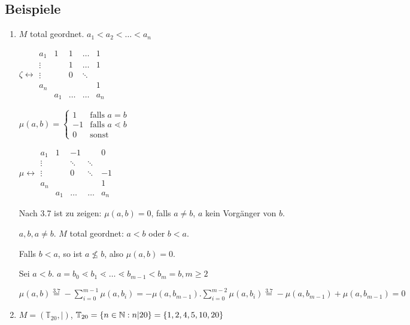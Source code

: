 \subsection{Beispiele} %

\begin{enumerate}
	\item 
	$M$ total geordnet. $a_1 < a_2 < \dots < a_n$
	
	$\zeta \leftrightarrow
	\begin{array}{c|cccc|}
	a_1 	& 1 & 1 & \dots & 1 \\
	\vdots  &	& 1 & \dots & 1 \\
	\vdots  & 	& 0 & \ddots & \\
	a_n		&   &	&		& 1 \\ %
			& a_1 & \dots &\dots & a_n
	\end{array}$
	
	$\mu(a, b) = \begin{cases}
	1 & \text{falls } a = b  \\
	-1 & \text{falls } a \lessdot b \\
	0 & \text{sonst}
	\end{cases}$
	
	$\mu \leftrightarrow
	\begin{array}{c|cccc|}
		a_1 	& 1 & -1 &  & 0 \\
		\vdots  &	& \ddots & \ddots &  \\
		\vdots  & 	& 0 & \ddots & -1\\
		a_n		&   &	&		& 1 \\ %
				& a_1 & \dots &\dots & a_n
		\end{array}$
		
	Nach 3.7 %
	ist zu zeigen: $\mu(a, b) = 0$, falls $a \neq b$, $a$ kein Vorgänger von $b$.
	
	$a, b, a \neq b$. $M$ total geordnet: $a < b$ oder $b < a$.
	
	Falls $b < a$, so ist $ a \nleq b$, also $\mu(a, b) = 0$.
	
	Sei $a < b$. $a = b_0 \lessdot b_1 \lessdot \dots \lessdot b_{m-1} < b_m = b, m \geq 2$
	
	$\mu(a, b) \stackrel{3.7}{=} %
	- \sum_{i=0}^{m-1}\mu(a, b_i) 
	= - \mu(a, b_{m-1}) . \sum_{i=0}^{m-2}\mu(a, b_i)
	\stackrel{3.7}{=} %
	- \mu(a, b_{m-1}) + \mu(a, b_{m-1})	= 0$
	
	
	\item
	
	$M = (\mathbb{T}_{20}, |)$,
	$\mathbb{T}_{20} = \left\{n \in \operatorname{\mathbb{N}} : n | 20\right\} = \left\{1, 2, 4, 5, 10, 20\right\}$
	

\end{enumerate}
